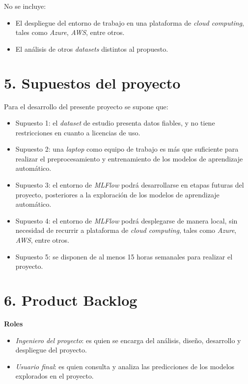 \documentclass[
11pt, %
]{charter}
\begin{document}
No se incluye:
\begin{itemize}
    \item El despliegue del entorno de trabajo en una plataforma de \textit{cloud computing}, tales como \textit{Azure}, \textit{AWS}, entre otros.
    \item El análisis de otros \textit{datasets} distintos al propuesto.
\end{itemize}

\section{5. Supuestos del proyecto}
\label{sec:supuestos}

Para el desarrollo del presente proyecto se supone que:
\begin{itemize}
	\item Supuesto 1: el \textit{dataset} de estudio presenta datos fiables, y no tiene restricciones en cuanto a licencias de uso.
	\item Supuesto 2: una \textit{laptop} como equipo de trabajo es más que suficiente para realizar el preprocesamiento y entrenamiento de los modelos de aprendizaje automático.
	\item Supuesto 3: el entorno de \textit{MLFlow} podrá desarrollarse en etapas futuras del proyecto, posteriores a la exploración de los modelos de aprendizaje automático.
    \item Supuesto 4: el entorno de \textit{MLFlow} podrá desplegarse de manera local, sin necesidad de recurrir a plataforma de \textit{cloud computing}, tales como \textit{Azure}, \textit{AWS}, entre otros.
    \item Supuesto 5: se disponen de al menos 15 horas semanales para realizar el proyecto.
\end{itemize}

\section{6. Product Backlog}
\label{sec:backlog}
\textbf{Roles}
\begin{itemize}
    \item \textit{Ingeniero del proyecto}: es quien se encarga del análisis, diseño, desarrollo y despliegue del proyecto.
    \item \textit{Usuario final}: es quien consulta y analiza las predicciones de los modelos explorados en el proyecto.
\end{itemize}
\end{document}
